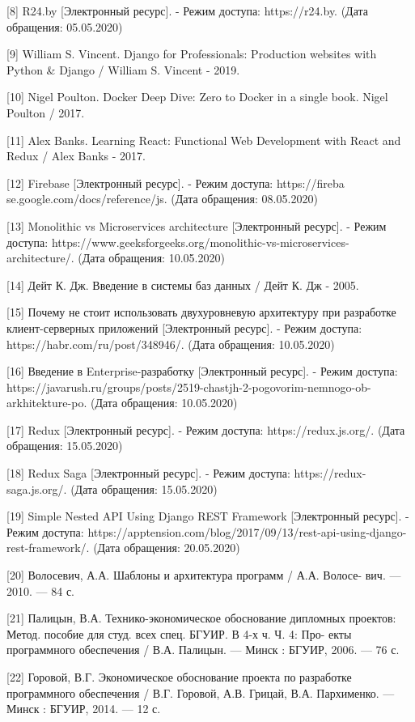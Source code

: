 [8] R24.by [Электронный ресурс]. - Режим доступа: https://r24.by. (Дата обращения: 05.05.2020)

[9] William S. Vincent. Django for Professionals: Production websites with Python \& Django / William S. Vincent - 2019.

[10] Nigel Poulton. Docker Deep Dive: Zero to Docker in a single book. Nigel Poulton / 2017.


[11] Alex Banks. Learning React: Functional Web Development with React and Redux / Alex Banks - 2017.

[12] Firebase [Электронный ресурс]. - Режим доступа: https://fireba  \linebreak se.google.com/docs/reference/js. (Дата обращения: 08.05.2020)

[13] Monolithic vs Microservices architecture [Электронный ресурс]. - Режим доступа: https://www.geeksforgeeks.org/monolithic-vs-microservices-architecture/. (Дата обращения: 10.05.2020)

[14] Дейт К. Дж. Введение в системы баз данных / Дейт К. Дж - 2005.

[15] Почему не стоит использовать двухуровневую архитектуру при разработке клиент-серверных приложений [Электронный ресурс]. - Режим доступа: https://habr.com/ru/post/348946/. (Дата обращения: 10.05.2020)

[16] Введение в Enterprise-разработку [Электронный ресурс]. - Режим доступа: https://javarush.ru/groups/posts/2519-chastjh-2-pogovorim-nemnogo-ob-arkhitekture-po. (Дата обращения: 10.05.2020)

[17] Redux [Электронный ресурс]. - Режим доступа: https://redux.js.org/. (Дата обращения: 15.05.2020)

[18] Redux Saga [Электронный ресурс]. - Режим доступа: https://redux-saga.js.org/. (Дата обращения: 15.05.2020)

[19] Simple Nested API Using Django REST Framework [Электронный ресурс]. - Режим доступа: https://apptension.com/blog/2017/09/13/rest-api-using-django-rest-framework/. (Дата обращения: 20.05.2020)

[20] Волосевич, А.А. Шаблоны и архитектура программ / А.А. Волосе- вич. — 2010. — 84 с.

[21] Палицын, В.А. Технико-экономическое обоснование дипломных проектов: Метод. пособие для студ. всех спец. БГУИР. В 4-х ч. Ч. 4: Про- екты программного обеспечения / В.А. Палицын. — Минск : БГУИР, 2006. — 76 с.

[22] Горовой, В.Г. Экономическое обоснование проекта по разработке программного обеспечения / В.Г. Горовой, А.В. Грицай, В.А. Пархименко. — Минск : БГУИР, 2014. — 12 с.
